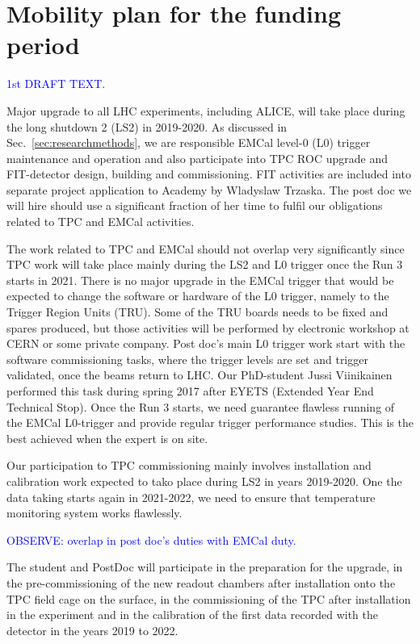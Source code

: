 \section{Mobility plan for the funding period}%
\label{sec:mobility}

\textcolor{blue}{1st DRAFT TEXT.}

Major upgrade to all LHC experiments, including ALICE, will take place during the long shutdown 2 (LS2) in 2019-2020. As discussed in Sec.~\ref{sec:researchmethods}, we are responsible EMCal level-0 (L0) trigger maintenance and operation and also participate into TPC ROC upgrade and FIT-detector design, building and commissioning. FIT activities are included into separate project application to Academy by Wladyslaw Trzaska. The post doc we will hire should use a significant fraction of her time to fulfil our obligations related to TPC and EMCal activities.

The work related to TPC and EMCal should not overlap very significantly since TPC work will take place mainly during the LS2 and L0 trigger once the Run 3 starts in 2021. There is no major upgrade in the EMCal trigger that would be expected to change the software or hardware of the L0 trigger, namely to the Trigger Region Units (TRU). Some of the TRU boards needs to be fixed and spares produced, but those activities will be performed by electronic workshop at CERN or some private company. Post doc’s main L0 trigger work start with the software commissioning tasks, where the trigger levels are set and trigger validated, once the beams return to LHC. Our PhD-student Jussi Viinikainen performed this task during spring 2017 after EYETS (Extended Year End Technical Stop). Once the Run 3 starts, we need guarantee flawless running of the EMCal L0-trigger and provide regular trigger performance studies. This is the best achieved when the expert is on site.

Our participation to TPC commissioning mainly involves installation and calibration work expected to tako place during LS2 in years 2019-2020. One the data taking starts again in 2021-2022, we need to ensure that temperature monitoring system works flawlessly. 

\textcolor{blue}{OBSERVE: overlap in post doc's duties with EMCal duty.}

The student and PostDoc will participate in the preparation for the upgrade, in the pre-commissioning of the new readout chambers after installation onto the TPC field cage on the surface, in the commissioning of the TPC after installation in the experiment and in the calibration of the first data recorded with the detector in the years 2019 to 2022. 

